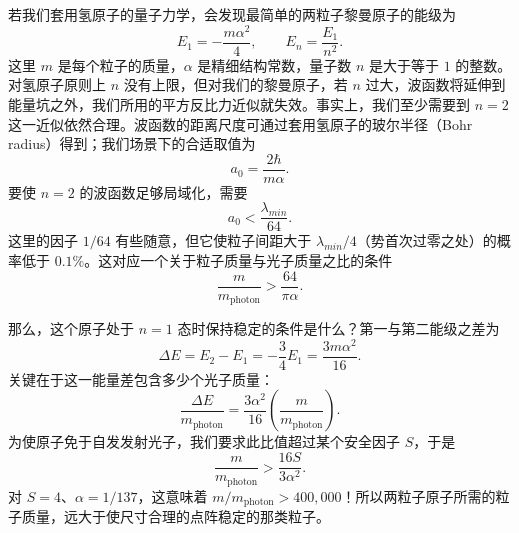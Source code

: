 若我们套用氢原子的量子力学，会发现最简单的两粒子黎曼原子的能级为
\begin{equation}
E_{1}=-\frac{m\alpha^{2}}{4},\qquad
E_{n}=\frac{E_{1}}{n^{2}} .
\end{equation}
这里 $m$ 是每个粒子的质量，$\alpha$ 是精细结构常数，量子数 $n$ 是大于等于 $1$ 的整数。对氢原子原则上 $n$ 没有上限，但对我们的黎曼原子，若 $n$ 过大，波函数将延伸到能量坑之外，我们所用的平方反比力近似就失效。事实上，我们至少需要到 $n=2$ 这一近似依然合理。波函数的距离尺度可通过套用氢原子的玻尔半径（Bohr radius）得到；我们场景下的合适取值为
\begin{equation}
a_{0}=\frac{2\hbar}{m\alpha}.
\end{equation}
要使 $n=2$ 的波函数足够局域化，需要
\begin{equation}
a_{0}<\frac{\lambda_{min}}{64}.
\end{equation}
这里的因子 $1/64$ 有些随意，但它使粒子间距大于 $\lambda_{min}/4$（势首次过零之处）的概率低于 $0.1\%$。这对应一个关于粒子质量与光子质量之比的条件
\begin{equation}
\frac{m}{m_{\mathrm{photon}}}>\frac{64}{\pi\alpha}.\tag{2a}
\end{equation}

那么，这个原子处于 $n=1$ 态时保持稳定的条件是什么？第一与第二能级之差为
\begin{equation}
\Delta E=E_{2}-E_{1}=-\frac{3}{4}E_{1}=\frac{3m\alpha^{2}}{16}.
\end{equation}
关键在于这一能量差包含多少个光子质量：
\begin{equation}
\frac{\Delta E}{m_{\mathrm{photon}}}=\frac{3\alpha^{2}}{16}\left(\frac{m}{m_{\mathrm{photon}}}\right).
\end{equation}
为使原子免于自发发射光子，我们要求此比值超过某个安全因子 $S$，于是
\begin{equation}
\frac{m}{m_{\mathrm{photon}}}>\frac{16S}{3\alpha^{2}}.\tag{2b}
\end{equation}
对 $S=4$、$\alpha=1/137$，这意味着 $m/m_{\mathrm{photon}}>400{,}000$！所以两粒子原子所需的粒子质量，远大于使尺寸合理的点阵稳定的那类粒子。

